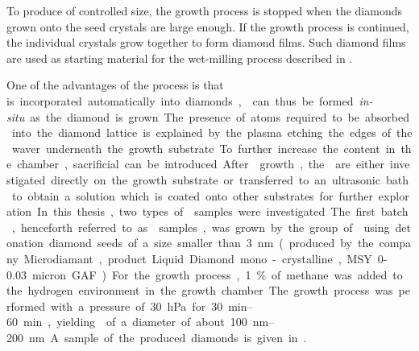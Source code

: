 	To produce \nds of controlled size, the growth process is stopped when the diamonds grown onto the seed crystals are large enough.
	If the growth process is continued, the individual crystals grow together to form diamond films.
	Such diamond films are used as starting material for the wet-milling process described in .

	One of the advantages of the \CVD process is that \si is incorporated automatically into diamonds, \sivs can thus be formed \textit{in-situ} as the diamond is grown. The presence of \si atoms required to be absorbed into the diamond lattice is explained by the plasma etching the edges of the \si waver underneath the growth substrate.
	To further increase the \si content in the chamber, sacrificial \si can be introduced.

	After \nd growth, the \nds are either investigated directly on the growth substrate or transferred to an ultrasonic bath to obtain a solution which is coated onto other substrates for further exploration.

	In this thesis, two types of \nds samples were investigated.
	The first batch, henceforth referred to as \CVD samples, was grown by the group of \schreck using detonation diamond seeds of a size smaller than \SI{3}{nm}(produced by the company Microdiamant, product Liquid Diamond mono-crystalline, MSY {0-0.03} micron GAF).
	For the growth process, \SI{1}{\percent} of methane was added to the hydrogen environment in the growth chamber.
	The growth process was performed with a pressure of \SI{30}{hPa} for \SIrange{30}{60}{min}, yielding \nds of a diameter of about \SIrange{100}{200}{nm}. A sample of the produced diamonds is given in .


